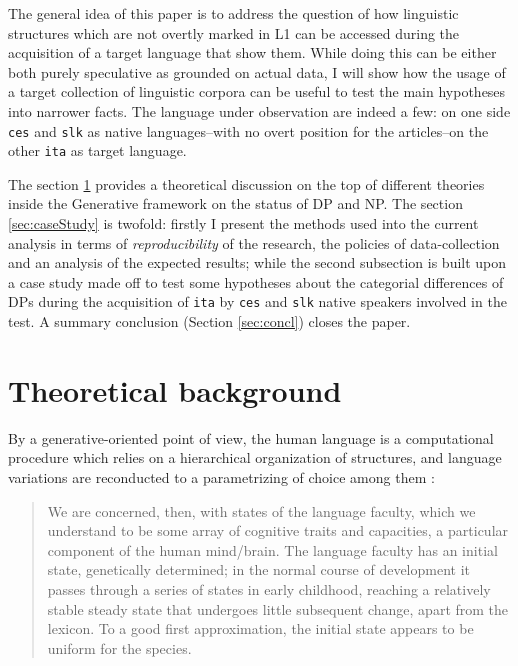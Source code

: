 \documentclass[a4paper,twoside,12pt,chapterprefix=false,listof=flat]{scrartcl}
\theoremstyle{plain} %
\theoremstyle{definition}
\theoremstyle{remark}
\begin{document}
The general idea of this paper is to address the question of how
linguistic structures which are not overtly marked in L1 can be accessed
during the acquisition of a target language that show them. While doing
this can be either both purely speculative as grounded on actual data, I
will show how the usage of a target collection of linguistic corpora can
be useful to test the main hypotheses into narrower facts. The language
under observation are indeed a few: on one side \texttt{ces} and
\texttt{slk} as native languages--with no overt position for the
articles--on the other \texttt{ita} as target language.

The section \ref{sec:theoryBg} provides a theoretical discussion on the
top of different theories inside the Generative framework
\citep{chomsky1995} on the status of DP and NP. The section
\ref{sec:caseStudy} is twofold: firstly I present the methods used into
the current analysis in terms of \emph{reproducibility} of the research,
the policies of data-collection and an analysis of the expected results;
while the second subsection is built upon a case study made off to test
some hypotheses about the categorial differences of DPs during the
acquisition of \texttt{ita} by \texttt{ces} and \texttt{slk} native
speakers involved in the test. A summary conclusion (Section
\ref{sec:concl}) closes the paper.

\section{Theoretical background}\label{sec:theoryBg}

By a generative-oriented point of view, the human language is a
computational procedure which relies on a hierarchical organization of
structures, and language variations are reconducted to a parametrizing
of choice among them
\citep{adger2013, chomsky1995, chomsky1998, chomsky2013, chomsky2015, rizzi2013}:

\begin{quote}
We are concerned, then, with states of the language faculty, which we
understand to be some array of cognitive traits and capacities, a
particular component of the human mind/brain. The language faculty has
an initial state, genetically determined; in the normal course of
development it passes through a series of states in early childhood,
reaching a relatively stable steady state that undergoes little
subsequent change, apart from the lexicon. To a good first
approximation, the initial state appears to be uniform for the species.
\citep{chomsky1995}
\end{quote}
\end{document}

